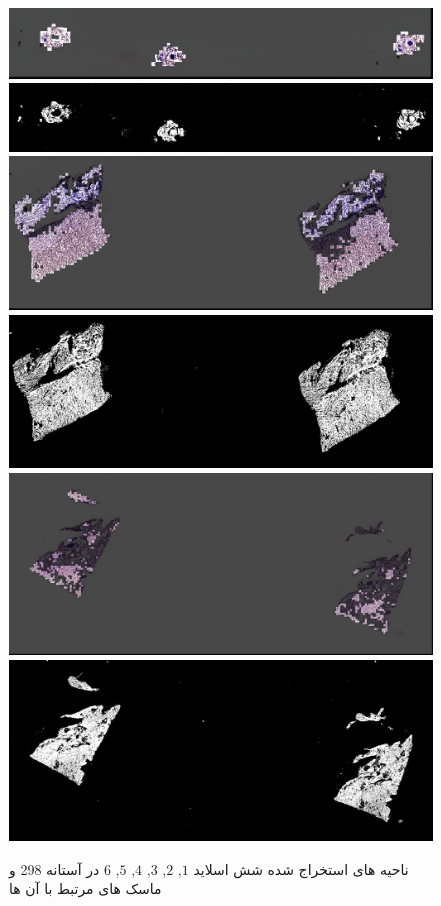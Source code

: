 \begin{enumerate}
\begin{figure}
\begin{center}
            \hspace{.2cm}
            \includegraphics[width=0.48\linewidth]{figs/introduction/subs/challenges/evaluate_slides/TCGA-EL-A4K7-11A-01-TS1.C08B59AA-87DF-4ABB-8B70-25FEF9893C7F__70_generated_mask.jpg}
            \includegraphics[width=0.48\linewidth]{figs/introduction/subs/challenges/evaluate_slides/TCGA-EL-A4K7-11A-01-TS1.C08B59AA-87DF-4ABB-8B70-25FEF9893C7F__70_masked.png}
            \hspace{.2cm}
            \includegraphics[width=0.48\linewidth]{figs/introduction/subs/challenges/evaluate_slides/TCGA-ET-A39N-01A-01-TSA.C38FCE19-9558-4035-9F0B-AD05B9BE321D___198_generated_mask.jpg}
            \includegraphics[width=0.48\linewidth]{figs/introduction/subs/challenges/evaluate_slides/TCGA-ET-A39N-01A-01-TSA.C38FCE19-9558-4035-9F0B-AD05B9BE321D___198_masked.png}
            \hspace{.2cm}
            \includegraphics[width=0.48\linewidth]{figs/introduction/subs/challenges/evaluate_slides/TCGA-BJ-A3F0-01A-01-TSA.728CE583-95BE-462B-AFDF-FC0B228DF3DE__3_generated_mask.jpg}
            \includegraphics[width=0.48\linewidth]{figs/introduction/subs/challenges/evaluate_slides/TCGA-BJ-A3F0-01A-01-TSA.728CE583-95BE-462B-AFDF-FC0B228DF3DE__3_masked.png}
        \end{center}
        \caption{ناحیه های استخراج شده شش اسلاید $1$, $2$, $3$, $4$, $5$, $6$ در آستانه 298 و ماسک های مرتبط با آن ها}
        \label{شکل: شش اسلاید و ماسک های مرتبط}
    \end{figure}
\end{enumerate}
